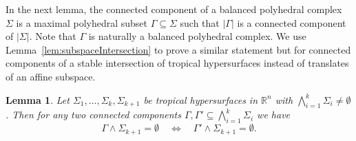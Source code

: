 \documentclass[11pt]{article}
\newtheorem{lemma}[theo]{Lemma}
\theoremstyle{definition}
\numberwithin{equation}{section}
\newcommand{\RR}{\mathbb{R}}
\begin{document}
In the next lemma, the connected component of a balanced polyhedral complex $\Sigma$ is a maximal polyhedral subset  $\Gamma\subseteq\Sigma$ such that $|\Gamma|$ is a connected component of $|\Sigma|$.  Note that $\Gamma$ is naturally a balanced polyhedral complex.  We use Lemma~\ref{lem:subspaceIntersection} to prove a similar statement but for connected components of a stable intersection of tropical hypersurfaces instead of translates of an affine subspace.

\begin{lemma}\label{lem:stableConspiracy}
  Let $\Sigma_1,\dots,\Sigma_k,\Sigma_{k+1}$ be tropical hypersurfaces in $\RR^n$ with $\bigwedge_{i=1}^k\Sigma_i\neq\emptyset$. Then for any two connected components $\Gamma,\Gamma'\subseteq \bigwedge_{i=1}^k\Sigma_i$ we have
  \[ \Gamma\wedge\Sigma_{k+1}=\emptyset \quad\Longleftrightarrow\quad \Gamma'\wedge\Sigma_{k+1}=\emptyset. \]
\end{lemma}
\end{document}
